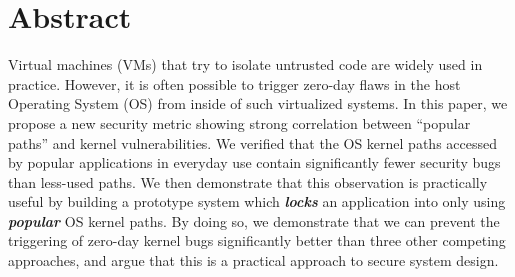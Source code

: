 \section*{Abstract}

%
%

%
%

Virtual machines (VMs) that try to isolate untrusted code are widely used in practice. 
However, it is often possible to trigger zero-day flaws
in the host Operating System (OS) from inside of such virtualized systems.
%
In this paper, we propose a new security metric showing strong correlation between ``popular paths'' 
and kernel vulnerabilities. We verified that the OS kernel paths accessed 
by popular applications in everyday use contain significantly fewer security bugs than less-used paths.  We then demonstrate that this observation is
practically useful by building a prototype system which \textbf{\textit{locks}} an
application into only using \textbf{\textit{popular}} OS kernel paths.  By doing so, we
demonstrate that
we can prevent the triggering of zero-day kernel bugs
significantly better than three other competing approaches, and argue that
this is a practical approach to  secure system design.
